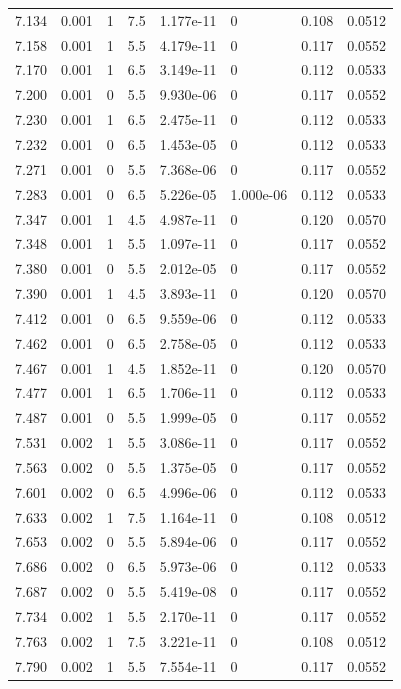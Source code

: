 \documentclass[preview]{standalone}
\begin{document}
{{{{{{{{\begin{tabular}{L{1.2cm}C{1.2cm} C{0.3cm}C{0.5cm} C{1.4cm}C{1.4cm} C{1.4cm}C{1.4cm}}
  7.134  &  0.001  & 1     & 7.5 &  1.177e-11  & 0  & 0.108 &  0.0512   \\ 
  7.158  &  0.001  & 1     & 5.5 &  4.179e-11  & 0  & 0.117 &  0.0552   \\ 
  7.170  &  0.001  & 1     & 6.5 &  3.149e-11  & 0  & 0.112 &  0.0533   \\ 
  7.200  &  0.001  & 0     & 5.5 &  9.930e-06  & 0  & 0.117 &  0.0552   \\ 
  7.230  &  0.001  & 1     & 6.5 &  2.475e-11  & 0  & 0.112 &  0.0533   \\ 
  7.232  &  0.001  & 0     & 6.5 &  1.453e-05  & 0  & 0.112 &  0.0533   \\ 
  7.271  &  0.001  & 0     & 5.5 &  7.368e-06  & 0  & 0.117 &  0.0552   \\ 
  7.283  &  0.001  & 0     & 6.5 &  5.226e-05  & 1.000e-06  & 0.112 &  0.0533   \\ 
  7.347  &  0.001  & 1     & 4.5 &  4.987e-11  & 0  & 0.120 &  0.0570   \\ 
  7.348  &  0.001  & 1     & 5.5 &  1.097e-11  & 0  & 0.117 &  0.0552   \\ 
  7.380  &  0.001  & 0     & 5.5 &  2.012e-05  & 0  & 0.117 &  0.0552   \\ 
  7.390  &  0.001  & 1     & 4.5 &  3.893e-11  & 0  & 0.120 &  0.0570   \\ 
  7.412  &  0.001  & 0     & 6.5 &  9.559e-06  & 0  & 0.112 &  0.0533   \\ 
  7.462  &  0.001  & 0     & 6.5 &  2.758e-05  & 0  & 0.112 &  0.0533   \\ 
  7.467  &  0.001  & 1     & 4.5 &  1.852e-11  & 0  & 0.120 &  0.0570   \\ 
  7.477  &  0.001  & 1     & 6.5 &  1.706e-11  & 0  & 0.112 &  0.0533   \\ 
  7.487  &  0.001  & 0     & 5.5 &  1.999e-05  & 0  & 0.117 &  0.0552   \\ 
  7.531  &  0.002  & 1     & 5.5 &  3.086e-11  & 0  & 0.117 &  0.0552   \\ 
  7.563  &  0.002  & 0     & 5.5 &  1.375e-05  & 0  & 0.117 &  0.0552   \\ 
  7.601  &  0.002  & 0     & 6.5 &  4.996e-06  & 0  & 0.112 &  0.0533   \\ 
  7.633  &  0.002  & 1     & 7.5 &  1.164e-11  & 0  & 0.108 &  0.0512   \\ 
  7.653  &  0.002  & 0     & 5.5 &  5.894e-06  & 0  & 0.117 &  0.0552   \\ 
  7.686  &  0.002  & 0     & 6.5 &  5.973e-06  & 0  & 0.112 &  0.0533   \\ 
  7.687  &  0.002  & 0     & 5.5 &  5.419e-08  & 0  & 0.117 &  0.0552   \\ 
  7.734  &  0.002  & 1     & 5.5 &  2.170e-11  & 0  & 0.117 &  0.0552   \\ 
  7.763  &  0.002  & 1     & 7.5 &  3.221e-11  & 0  & 0.108 &  0.0512   \\ 
  7.790  &  0.002  & 1     & 5.5 &  7.554e-11  & 0  & 0.117 &  0.0552   \\ 
\hline 
\end{tabular} 

}}}}}}}}
\end{document}
